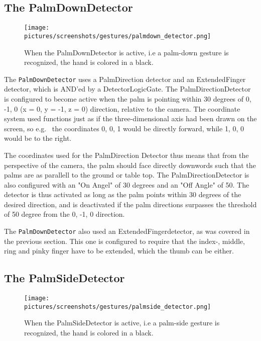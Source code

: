 \subsection{The PalmDownDetector}
\begin{figure}%
	\texttt{[image: pictures/screenshots/gestures/palmdown\_detector.png]}
	\caption[The palmdown gesture]{When the PalmDownDetector is active, i.e a palm-down gesture is recognized, the hand is colored in a black.}
	\label{fig:palmdown_detector}
\end{figure}
The \texttt{PalmDownDetector} uses a PalmDirection detector and an ExtendedFinger detector, which is AND'ed by a DetectorLogicGate. 
The PalmDirectionDetector is configured to become active when the palm is pointing within 30 degrees of {0, -1, 0} (x = 0, y = -1, z = 0) direction, relative to the camera.
The coordinate system used functions just as if the three-dimensional axis had been drawn on the screen, so e.g.~ the coordinates {0, 0, 1} would be directly forward, while
{1, 0, 0} would be to the right.

The coordinates used for the PalmDirection Detector thus means that from the perspective of the camera, the palm should face directly downwords such that the 
palms are as parallell to the ground or table top.
The PalmDirectionDetector is also configured with an "On Angel" of 30 degrees and an "Off Angle" of 50. The detector is thus activated as long as the palm points within 
30 degrees of the desired direction, and is deactivated if the palm directions surpasses the threshold of 50 degree from the {0, -1, 0} direction.

The \texttt{PalmDownDetector} also used an ExtendedFingerdetector, as was covered in the previous section. This one is configured to require that 
the index-, middle, ring and pinky finger have to be extended, which the thumb can be either. 

\subsection{The PalmSideDetector}
\begin{figure}%
	\texttt{[image: pictures/screenshots/gestures/palmside\_detector.png]}
	\caption[The palmside gesture]{When the PalmSideDetector is active, i.e a palm-side gesture is recognized, the hand is colored in a black.}
	\label{fig:palmside_detector}
\end{figure} 

